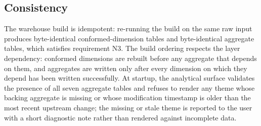 \subsection{Consistency}
\label{sec:solution:architecture:guarantees}

The warehouse build is idempotent: re-running the build on the same raw
input produces byte-identical conformed-dimension tables and
byte-identical aggregate tables, which satisfies requirement N3. The build
ordering respects the layer dependency: conformed dimensions are rebuilt
before any aggregate that depends on them, and aggregates are written only
after every dimension on which they depend has been written successfully.
At startup, the analytical surface validates the presence of all seven
aggregate tables and refuses to render any theme whose backing aggregate
is missing or whose modification timestamp is older than the most recent
upstream change; the missing or stale theme is reported to the user with a
short diagnostic note rather than rendered against incomplete data.
